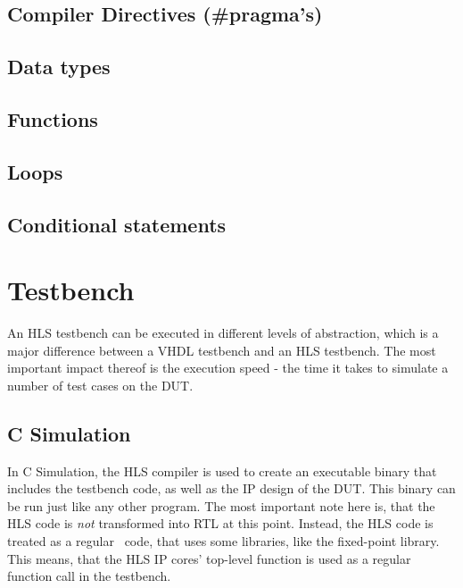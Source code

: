 \subsection{Compiler Directives (\#pragma's)}

\subsection{Data types}

\subsection{Functions}

\subsection{Loops}

\subsection{Conditional statements}

\section{Testbench}

An HLS testbench can be executed in different levels of abstraction, which is a major difference between a VHDL testbench and an HLS testbench.
The most important impact thereof is the execution speed - the time it takes to simulate a number of test cases on the DUT.

\subsection{C Simulation}

In C Simulation, the HLS compiler is used to create an executable binary that includes the testbench code, as well as the IP design of the DUT.
This binary can be run just like any other program.
The most important note here is, that the HLS code is \textit{not} transformed into RTL at this point.
Instead, the HLS code is treated as a regular \cplusplus\ code, that uses some libraries, like the fixed-point library.
This means, that the HLS IP cores' top-level function is used as a regular function call in the testbench.\\

